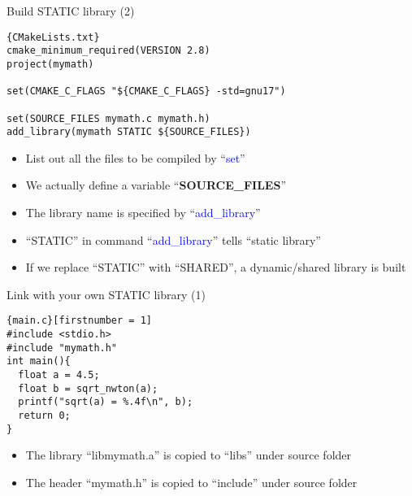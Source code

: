 \begin{frame}[fragile]{Build STATIC library (2)}
\begin{lstlisting}[linewidth=0.95\linewidth, firstnumber= 1, xleftmargin=0.02\linewidth]{CMakeLists.txt}
cmake_minimum_required(VERSION 2.8)
project(mymath)

set(CMAKE_C_FLAGS "${CMAKE_C_FLAGS} -std=gnu17")

set(SOURCE_FILES mymath.c mymath.h)
add_library(mymath STATIC ${SOURCE_FILES})

\end{lstlisting}

\begin{itemize}
	\item {List out all the files to be compiled by ``\textcolor{blue}{set}''}
	\item {We actually define a variable ``\textbf{SOURCE\_FILES}''}
	\item {The library name is specified by ``\textcolor{blue}{add\_library}''}
	\item {``STATIC'' in command ``\textcolor{blue}{add\_library}'' tells ``static library''}
	\item {If we replace ``STATIC'' with ``SHARED'', a dynamic/shared library is built}
\end{itemize}
\end{frame}

\begin{frame}[fragile]{Link with your own STATIC library (1)}
\vspace{-0.1in}
\begin{lstlisting}{main.c}[firstnumber = 1]
#include <stdio.h>
#include "mymath.h"
int main(){
  float a = 4.5;
  float b = sqrt_nwton(a);
  printf("sqrt(a) = %.4f\n", b);
  return 0;
}
\end{lstlisting}
\begin{itemize}
	\item {The library ``libmymath.a'' is copied to ``libs'' under source folder}
	\item {The header ``mymath.h'' is copied to ``include'' under source folder}
\end{itemize}
\end{frame}

